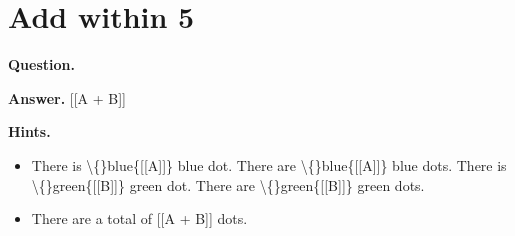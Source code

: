 \documentclass{article}
\begin{document}
\section*{Add within 5}
\textbf{Question.} 

\textbf{Answer.} [[A + B]]

\textbf{Hints.}
\begin{itemize}
  \item There is \textbackslash\{\}blue\{[[A]]\} blue dot.
                        There are \textbackslash\{\}blue\{[[A]]\} blue dots.
                        There is \textbackslash\{\}green\{[[B]]\} green dot.
                        There are \textbackslash\{\}green\{[[B]]\} green dots.
  \item There are a total of [[A + B]] dots.
\end{itemize}
\end{document}

